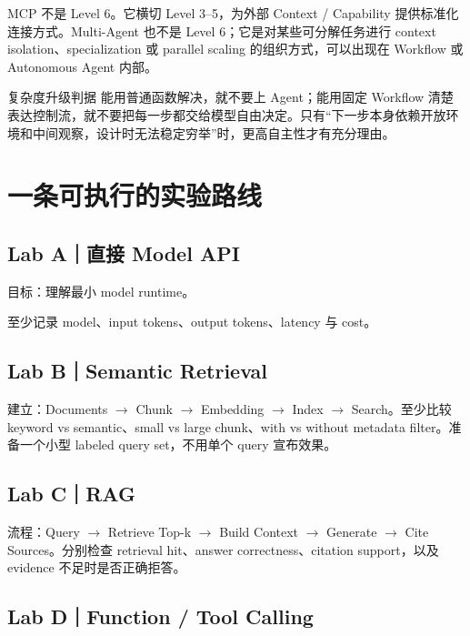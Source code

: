 \documentclass[profile=standard,twoside=false]{ipara-handbook}
\begin{document}
MCP 不是 Level 6。它横切 Level 3--5，为外部 Context / Capability 提供标准化连接方式。Multi-Agent 也不是 Level 6；它是对某些可分解任务进行 context isolation、specialization 或 parallel scaling 的组织方式，可以出现在 Workflow 或 Autonomous Agent 内部。

\begin{criterion}{复杂度升级判据}
能用普通函数解决，就不要上 Agent；能用固定 Workflow 清楚表达控制流，就不要把每一步都交给模型自由决定。只有“下一步本身依赖开放环境和中间观察，设计时无法稳定穷举”时，更高自主性才有充分理由。
\end{criterion}

\section{一条可执行的实验路线}

\subsection{Lab A｜直接 Model API}

目标：理解最小 model runtime。

\begin{processchain}
\end{processchain}

至少记录 model、input tokens、output tokens、latency 与 cost。

\subsection{Lab B｜Semantic Retrieval}

建立：Documents $\to$ Chunk $\to$ Embedding $\to$ Index $\to$ Search。至少比较 keyword vs semantic、small vs large chunk、with vs without metadata filter。准备一个小型 labeled query set，不用单个 query 宣布效果。

\subsection{Lab C｜RAG}

流程：Query $\to$ Retrieve Top-k $\to$ Build Context $\to$ Generate $\to$ Cite Sources。分别检查 retrieval hit、answer correctness、citation support，以及 evidence 不足时是否正确拒答。

\subsection{Lab D｜Function / Tool Calling}
\end{document}
